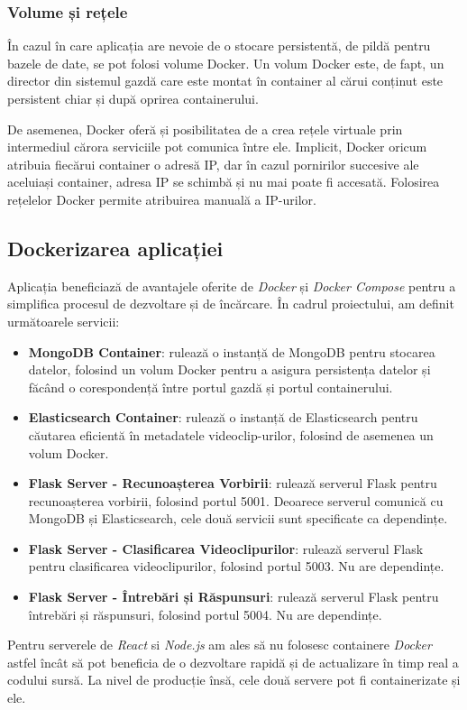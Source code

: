 \subsubsection{Volume și rețele}
\par
În cazul în care aplicația are nevoie de o stocare persistentă, de pildă pentru bazele de date, se pot
folosi volume Docker. Un volum Docker este, de fapt, un director din sistemul gazdă care este montat în
container al cărui conținut este persistent chiar și după oprirea containerului.

\par
De asemenea, Docker oferă și posibilitatea de a crea rețele virtuale prin intermediul cărora serviciile
pot comunica între ele. Implicit, Docker oricum atribuia fiecărui container o adresă IP, dar în cazul
pornirilor succesive ale aceluiași container, adresa IP se schimbă și nu mai poate fi accesată. Folosirea
rețelelor Docker permite atribuirea manuală a IP-urilor.

\subsection{Dockerizarea aplicației}
\par
Aplicația beneficiază de avantajele oferite de \textit{Docker} și \textit{Docker Compose} pentru a simplifica procesul
de dezvoltare și de încărcare. În cadrul proiectului, am definit următoarele servicii:

\begin{itemize}
    \item \textbf{MongoDB Container}: rulează o instanță de MongoDB pentru stocarea datelor, folosind
    un volum Docker pentru a asigura persistența datelor și făcând o corespondență între portul gazdă
    și portul containerului.
    \item \textbf{Elasticsearch Container}: rulează o instanță de Elasticsearch pentru căutarea eficientă
    în metadatele videoclip-urilor, folosind de asemenea un volum Docker.
    \item \textbf{Flask Server - Recunoașterea Vorbirii}: rulează serverul Flask pentru recunoașterea
    vorbirii, folosind portul 5001. Deoarece serverul comunică cu MongoDB și Elasticsearch, cele două
    servicii sunt specificate ca dependințe.
    \item \textbf{Flask Server - Clasificarea Videoclipurilor}: rulează serverul Flask pentru clasificarea
    videoclipurilor, folosind portul 5003. Nu are dependințe.
    \item \textbf{Flask Server - Întrebări și Răspunsuri}: rulează serverul Flask pentru întrebări și
    răspunsuri, folosind portul 5004. Nu are dependințe.
\end{itemize}

\par
Pentru serverele de \textit{React} si \textit{Node.js} am ales să nu folosesc containere \textit{Docker}
astfel încât să pot beneficia de o dezvoltare rapidă și de actualizare în timp real a codului sursă. La
nivel de producție însă, cele două servere pot fi containerizate și ele.

